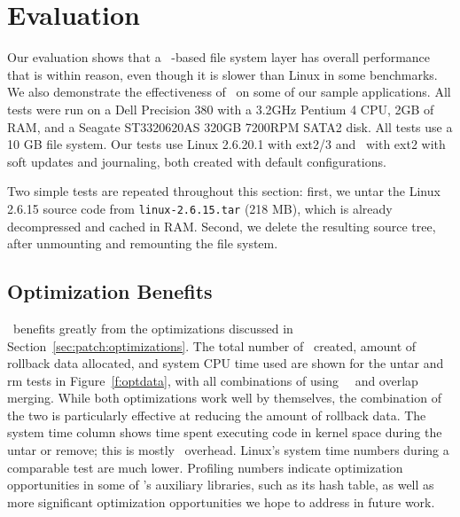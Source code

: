 \section {Evaluation}
\label{sec:evaluation}

Our evaluation shows that a \Kudos\ \patch-based file system layer has
overall performance that is within reason, even though it is slower than
Linux in some benchmarks.  We also demonstrate the effectiveness of
\patchgroups\ on some of our sample applications. All tests were run on a
Dell Precision 380 with a 3.2GHz Pentium 4 CPU, 2GB of RAM, and a Seagate
ST3320620AS 320GB 7200RPM SATA2 disk.
%
All tests use a 10 GB file system.
%
Our tests use Linux 2.6.20.1 with ext2/3 and \Kudos\ with ext2 with
soft updates and journaling, both created with default configurations.

Two simple tests are repeated throughout this section: first, we untar
the Linux 2.6.15 source code from \texttt{linux-2.6.15.tar} (218 MB), which is
already decompressed and cached in RAM. Second, we delete the resulting source
tree, after unmounting and remounting the file system.

\subsection {Optimization Benefits}

\Kudos\ benefits greatly from the optimizations discussed in
Section~\ref{sec:patch:optimizations}. The total number of \patches\ created,
amount of rollback data allocated, and system CPU time used are shown for the
untar and rm tests in Figure~\ref{f:optdata}, with all combinations of using
\nrb\ \patches\ and overlap merging. While both optimizations work well by
themselves, the combination of the two is particularly effective at reducing the
amount of rollback data.
%
The system time column shows time spent executing code in kernel space
during the untar or remove; this is mostly \Kudos\ overhead.  Linux's
system time numbers during a comparable test are much lower.  Profiling
numbers indicate optimization opportunities in some of \Kudos's auxiliary
libraries, such as its hash table, as well as more significant optimization
opportunities we hope to address in future work.


